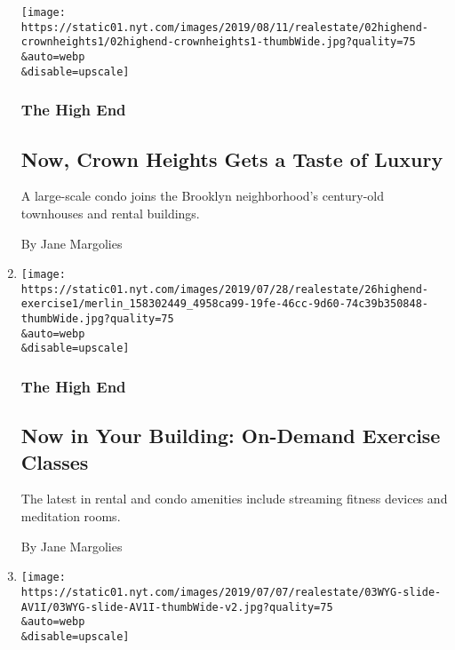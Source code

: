 \begin{enumerate}
  \texttt{[image: https://static01.nyt.com/images/2019/08/11/realestate/02highend-crownheights1/02highend-crownheights1-thumbWide.jpg?quality=75\\\&auto=webp\\\&disable=upscale]}

  \hypertarget{the-high-end-6}{%
  \subsubsection{The High End}\label{the-high-end-6}}

  \hypertarget{now-crown-heights-gets-a-taste-of-luxury-1}{%
  \subsection{Now, Crown Heights Gets a Taste of
  Luxury}\label{now-crown-heights-gets-a-taste-of-luxury-1}}

  A large-scale condo joins the Brooklyn neighborhood's century-old
  townhouses and rental buildings.

  By Jane Margolies
\item
  \href{/2019/07/26/realestate/now-in-your-building-on-demand-exercise-classes.html}{}

  \texttt{[image: https://static01.nyt.com/images/2019/07/28/realestate/26highend-exercise1/merlin\_158302449\_4958ca99-19fe-46cc-9d60-74c39b350848-thumbWide.jpg?quality=75\\\&auto=webp\\\&disable=upscale]}

  \hypertarget{the-high-end-7}{%
  \subsubsection{The High End}\label{the-high-end-7}}

  \hypertarget{now-in-your-building-on-demand-exercise-classes}{%
  \subsection{Now in Your Building: On-Demand Exercise
  Classes}\label{now-in-your-building-on-demand-exercise-classes}}

  The latest in rental and condo amenities include streaming fitness
  devices and meditation rooms.

  By Jane Margolies
\item
  \href{/2019/07/03/realestate/5-5-million-homes-in-new-york-illinois-and-missouri.html}{}

  \texttt{[image: https://static01.nyt.com/images/2019/07/07/realestate/03WYG-slide-AV1I/03WYG-slide-AV1I-thumbWide-v2.jpg?quality=75\\\&auto=webp\\\&disable=upscale]}


\end{enumerate}
